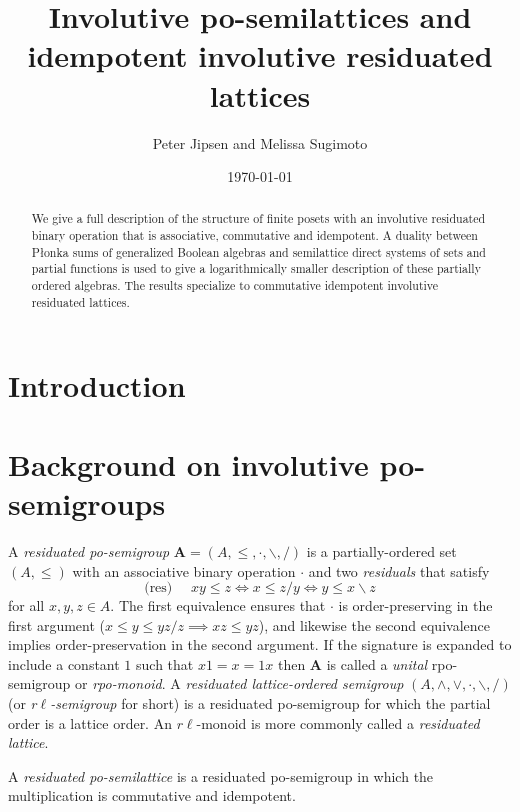\documentclass[12pt]{amsart}
\title[Involutive po-semilattices]{Involutive po-semilattices and idempotent involutive residuated lattices}
\author{Peter Jipsen and Melissa Sugimoto}
\date{\today}%
\newcommand{\m}{\mathbf} %
\newcommand{\rd}{{/}}
\newcommand{\ld}{{\backslash}}
\begin{document}
\begin{abstract}
We give a full description of the structure of finite
posets with an involutive residuated binary operation that is associative, commutative and idempotent.
A duality between P\l onka sums of generalized Boolean algebras
and semilattice direct systems of sets and partial functions
is used to give a logarithmically smaller description of these partially
ordered algebras. The results specialize to commutative idempotent
involutive residuated lattices.
\end{abstract}

\maketitle

\section{Introduction}


\section{Background on involutive po-semigroups}
A \emph{residuated po-semigroup} $\m A=(A,\le,\cdot,\ld,\rd)$ is a partially-ordered set $(A,\le)$ with an associative binary operation $\cdot$ and two \emph{residuals} that satisfy
$$
\text{(res) }\quad xy\le z\iff x\le z\rd y\iff y\le x\ld z
$$
for all $x,y,z\in A$.
The first equivalence ensures that $\cdot$ is order-preserving in the first argument ($x\le y\le yz\rd z\implies xz\le yz$), and likewise the second equivalence implies order-preservation in the second argument. 
If the signature is expanded to include a constant $1$ such that $x1=x=1x$ then
$\m A$ is called a \emph{unital} rpo-semigroup or \emph{rpo-monoid}.
A \emph{residuated lattice-ordered semigroup} $(A,\wedge,\vee,\cdot,\ld,\rd)$ (or \emph{r$\ell$-semigroup} for short) is a residuated po-semigroup for which the partial order is
a lattice order. An $r\ell$-monoid is more commonly called a \emph{residuated lattice}.

A \emph{residuated po-semilattice} is a residuated po-semigroup in which the multiplication is commutative and idempotent.
\end{document}
